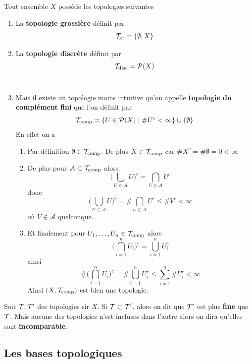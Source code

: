 \begin{exemple}
	Tout ensemble $X$ possède les topologies suivantes
	\begin{enumerate}
		\item La \textbf{topologie grossière} définit par
		\[
		\mathcal T_{\mathrm{gr}} = \{ \emptyset, X\}
		\]
		\item La \textbf{topologie discrète} définit par
		\[
		\mathcal T_{\mathrm{disc}} = \mathcal P(X)
		\]
		\
	
	 \item Mais il existe un topologie moins intuitive qu'on appelle \textbf{topologie du complément fini} que l'on définit par
	\[
	\mathcal T_{\mathrm{comp}} = \{ U \in \mathcal P(X) \mid \# U^c < \infty\} \cup \{\emptyset\}
	\]
	En effet on a 
	\begin{enumerate}
		\item[\TU : ] Par définition $\emptyset \in \mathcal T_{\mathrm{comp}}$. De plus $X \in \mathcal T_{\mathrm{comp}}$ car $\# X^c = \# \emptyset = 0 < \infty$
		
		\item[\TD : ] De plus pour $ \mathcal A \subset \mathcal T_{\mathrm{comp}}$ alors
		\[
		\bigg(\bigcup_{U \in \mathcal A} U \bigg)^c = \bigcap_{U \in \mathcal A} U^c
		\]
		donc
		\[
		\bigg(\bigcup_{U \in \mathcal A} U \bigg)^c = \#\bigcap_{U \in \mathcal A} U^c \leqslant \# V^c < \infty
		\]
		où $V \in \mathcal A$ quelconque. 
		
		\item[\TT: ] Et finalement pour $U_1, \ldots, U_n \in \mathcal T_{\mathrm{comp}}$ alors
		\[
		\bigg(\bigcap_{i=1}^n U_i \bigg)^c = \bigcup_{i=1}^n U_i^c
		\]
		ainsi
		\[
		\#\bigg(\bigcap_{i=1}^n U_i \bigg)^c = \#\bigcup_{i=1}^n U_i^c \leqslant \sum_{i=1}^n \# U_i^c < \infty
		\]
		Ainsi $(X, \mathcal T_{\mathrm{comp}})$ est bien une topologie.
		
	\end{enumerate}
\end{enumerate}

\end{exemple}

\begin{definition}
	Soit $\mathcal T, \mathcal T'$ des topologies sir $X$. Si $\mathcal T \subset \mathcal T'$, alors on dit que $\mathcal T'$ est plus \textbf{fine} que $\mathcal T$. Mais aucune des topologies n'est incluses dans l'autre alors on dira qu'elles sont \textbf{incomparable}.
\end{definition}

\subsection{Les bases topologiques}

